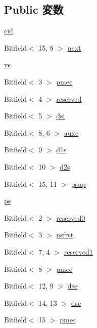 \subsection*{Public 変数}
\begin{DoxyCompactItemize}
\item 
\hyperlink{structPMCAP_abc570b1db8821b4150cc5694fb524fca}{cid}
\item 
Bitfield$<$ 15, 8 $>$ \hyperlink{structPMCAP_a8bb6f66c6230d47ae653bb69bad27694}{next}
\item 
\hyperlink{structPMCAP_a618735a7c9209dc2ecdc8a22b793d39a}{vs}
\item 
Bitfield$<$ 3 $>$ \hyperlink{structPMCAP_a3fab197c9a34b62a94bb3869a80568db}{pmec}
\item 
Bitfield$<$ 4 $>$ \hyperlink{structPMCAP_a0f2c966eea27ed7a9d607165c9726f9f}{reserved}
\item 
Bitfield$<$ 5 $>$ \hyperlink{structPMCAP_a92ad8a49ea1f94940bda931c67e14ce2}{dsi}
\item 
Bitfield$<$ 8, 6 $>$ \hyperlink{structPMCAP_af86d807cf01a2f3d2e51c3929a24482f}{auxc}
\item 
Bitfield$<$ 9 $>$ \hyperlink{structPMCAP_abcde1e15d12e56d55b1a33826395e6d7}{d1s}
\item 
Bitfield$<$ 10 $>$ \hyperlink{structPMCAP_a58cd68f73c8cb7be575837b8cf858acc}{d2s}
\item 
Bitfield$<$ 15, 11 $>$ \hyperlink{structPMCAP_af48baa9b38f842caa2a959b61a6639cf}{psup}
\item 
\hyperlink{structPMCAP_a229da043140a249b194ce5119e274173}{ps}
\item 
Bitfield$<$ 2 $>$ \hyperlink{structPMCAP_a3a000414676bb935cf6ecf353ef1895e}{reserved0}
\item 
Bitfield$<$ 3 $>$ \hyperlink{structPMCAP_aae0b62284fee5304d348cd5737aac166}{nsfrst}
\item 
Bitfield$<$ 7, 4 $>$ \hyperlink{structPMCAP_ab4c7eb001c06e169dbf1a0ff49da54e8}{reserved1}
\item 
Bitfield$<$ 8 $>$ \hyperlink{structPMCAP_a17aa7aa4eb5072efc87f2f6285cd4047}{pmee}
\item 
Bitfield$<$ 12, 9 $>$ \hyperlink{structPMCAP_acbd844d8a53183d4f22c7b00dfac6ffb}{dse}
\item 
Bitfield$<$ 14, 13 $>$ \hyperlink{structPMCAP_ace1514e06ca1ae5d287a0cf2990cc0e3}{dsc}
\item 
Bitfield$<$ 15 $>$ \hyperlink{structPMCAP_a6962edaffb64174260afc3f2cfe4f197}{pmes}
\end{DoxyCompactItemize}


